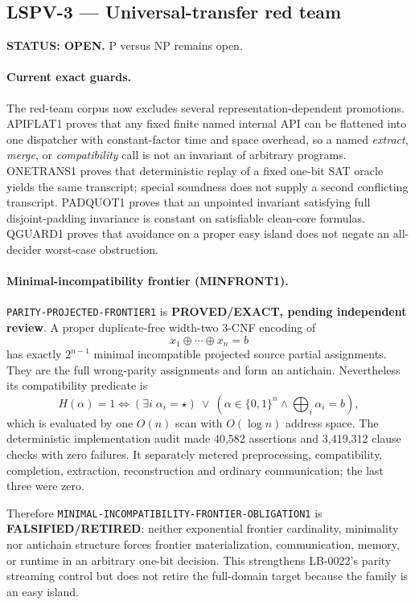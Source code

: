 \documentclass[11pt]{article}
\begin{document}
\subsection{LSPV-3 --- Universal-transfer red team}
\textbf{STATUS: OPEN.} P versus NP remains open.

\paragraph{Current exact guards.}
The red-team corpus now excludes several representation-dependent promotions.
APIFLAT1 proves that any fixed finite named internal API can be flattened into
one dispatcher with constant-factor time and space overhead, so a named
\emph{extract}, \emph{merge}, or \emph{compatibility} call is not an invariant
of arbitrary programs.  ONETRANS1 proves that deterministic replay of a fixed
one-bit SAT oracle yields the same transcript; special soundness does not
supply a second conflicting transcript.  PADQUOT1 proves that an unpointed
invariant satisfying full disjoint-padding invariance is constant on
satisfiable clean-core formulas.  QGUARD1 proves that avoidance on a proper
easy island does not negate an all-decider worst-case obstruction.

\paragraph{Minimal-incompatibility frontier (MINFRONT1).}
\texttt{PARITY-PROJECTED-FRONTIER1} is
\textbf{PROVED/EXACT, pending independent review}.  A proper duplicate-free
width-two 3-CNF encoding of
\[
x_1\oplus\cdots\oplus x_n=b
\]
has exactly $2^{n-1}$ minimal incompatible projected source partial
assignments.  They are the full wrong-parity assignments and form an
antichain.  Nevertheless its compatibility predicate is
\[
H(\alpha)=1
\iff (\exists i\;\alpha_i=\star)
\ \vee\
(\alpha\in\{0,1\}^n\land\bigoplus_i\alpha_i=b),
\]
which is evaluated by one $O(n)$ scan with $O(\log n)$ address space.
The deterministic implementation audit made 40,582 assertions and 3,419,312
clause checks with zero failures.  It separately metered preprocessing,
compatibility, completion, extraction, reconstruction and ordinary
communication; the last three were zero.

Therefore
\texttt{MINIMAL-INCOMPATIBILITY-FRONTIER-OBLIGATION1} is
\textbf{FALSIFIED/RETIRED}: neither exponential frontier cardinality,
minimality nor antichain structure forces frontier materialization,
communication, memory, or runtime in an arbitrary one-bit decision.
This strengthens LB-0022's parity streaming control but does not retire the
full-domain target because the family is an easy island.
\end{document}
